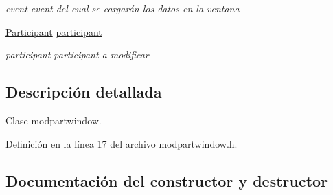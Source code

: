 \begin{DoxyCompactItemize}
\begin{DoxyCompactList}\small\item\em event event del cual se cargarán los datos en la ventana \end{DoxyCompactList}\item 
\hyperlink{class_participant}{Participant} \hyperlink{classmodpartwindow_a52f8b015c48419a094701e1c4ad30b0c}{participant}\hypertarget{classmodpartwindow_a52f8b015c48419a094701e1c4ad30b0c}{}\label{classmodpartwindow_a52f8b015c48419a094701e1c4ad30b0c}

\begin{DoxyCompactList}\small\item\em participant participant a modificar \end{DoxyCompactList}\end{DoxyCompactItemize}


\subsection{Descripción detallada}
Clase modpartwindow. 

Definición en la línea 17 del archivo modpartwindow.\+h.



\subsection{Documentación del constructor y destructor}
